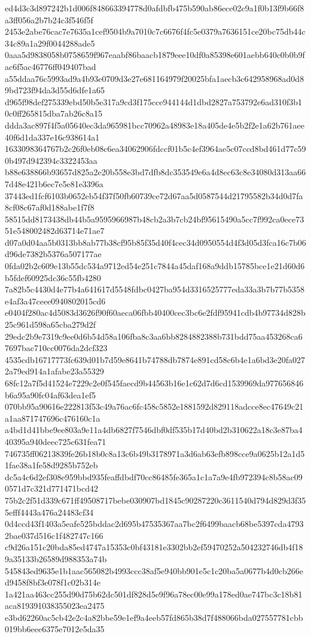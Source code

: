 {ed4d3c3d897242b1d006f848663394778d0afdbfb475b590ab86ece02c9a1f0b13f9b66f8a3ff056a2b7b24c3f546f5f
2453e2abe76cac7e7635a1cef9504b9a7010c7c6676f4fc5e0379a7636151ce20bc75db44c34c89a1a29f0044288ade5
0aaa5d9838058b0758659f967eaabf86baacb1879eee10df0a85398e601aebb640c0b0b9fac6f5ac46776ff049407bad
a55ddaa76c5993ad9a4b93e0709d3e27e681164979f20025bfa1aecb3c642958968ad0d89bd723f94da3d55d6dfe1a65
d965f98def275339ebd50b5e317a9cd3f175cce944144d1dbd2827a753792e6ad310f3b10c0ff265815dba7ab26c8a15
ddda3ac897f4f5a05640ec3da965981bcc70962a48983e18a405de4e5b2f2e1a62b761aee40f6d1da337e16c938614a1
1633098364767b2c26f0eb08c6ea34062906fdccf01b5c4ef3964ae5c07ccd8bd461d77c590b497d942394c3322453aa
b88e638866b93657d825a2e20b558e3bd7dfb8dc353549e6a4d8ec63c8e34080d313aa667d48e421b6ec7e5e81e3396a
37443ed1fcf6103b0652eb54f37f50fb60739ce72d67aa5d0587544d21795582b34d0d7fa8cf08c67af0d188abe1f7f8
58515dd8173438db44b5a9595966987b48cb2a3b7cb24bf95615490a5cc7f992ca0ece7351e548002482d63714e71ae7
d07a0d04aa5b0313bb8ab77b38cf95b85f35d40f4cec34d0950554d4f3d05d3fca16c7b06d96de7382b5376a507177ae
0fda02b2c609e13b55dc534a9712ed54e251c7844a45daf168a9ddb15785bce1e21d60d6b5fdef60925dc36c55fb4280
7a82b5c4430d4e77b4a641617d5548fdbc0427ba954d3316525777eda33a3b7b77b5358e4af3a47ceee0940802015cd6
e0404f280ac4d5083d3626f90f60aeca06fbb40400cec3bc6e2fdf95941cdb4b97734d828b25c961d598a65cba279d2f
29edc2b9e7319c9ee0d6b54d58a106fba8c3aa6bb8284882388b731bdd75aa453268ca67697bac710cc0076da2dcf323
4535cdb16717773fc639d01b7d59e8641b74788db7874e891cd58c6b4e1a6bd3e20fa0272a79ed914a1afabe23a55329
68fc12a7f5d41524e7229c2e0f545faecd9b44563b16e1c62d7d6cd1539969da977656846b6a95a90fc04af63dea1ef5
070bb95a90616e222813f53c49a76ac6fc458c5852e1881592d829118adcce8ec47649c21a1aa871747696c476160c1a
a4bd1d41bbe9ee803a9e11a4db6827f7546dbf0df535b17d40bd2b310622a18c3e87ba440395a940deec725c631fea71
746735ff06213839fe26b18b0c8a13c6b49b3178971a3d6ab63efb898cce9a0625b12a1d51fae38a1fe58d9285b752eb
dc5a4c6d2ef308e959bbd935feaffdbdf70cc86485fe365a1c1a7a9e4fb972394c8b58ac090571d7c321d771471bcd42
75b2c2f51d339c671ff49508717bebe030907bd1845c90287220c3611540d794d829d3f355efff4443a476a24483cf34
0d4ccd43f1403a5eafe525bddac2d695b47535367aa7bc2f6499baacb68be5397cda47932bae037d516c1f482747c166
c9d26a151c20bda85ed4747a15353c0bf43181e3302bb2ef59470252a504232746db4f189a35133b26589d988353a74b
545843ed9635e1b1aac565082b4993ccc38af5e940bb901e5c1c20ba5a0677b4d0cb266ed9458f8bf3e078f1c02b314e
1a421aa463cc255d90d75b62dc501df828d5e9f96a78ec00e99a178ed0ae747bc3c18b81aca819391038355023ea2475
e3bd62260ac5cb42e2c4a82bbe59e1ef9a4eeb57fd865b38d7f488066bda027557781cbb019bb6eee6375e7012e5da35
}
